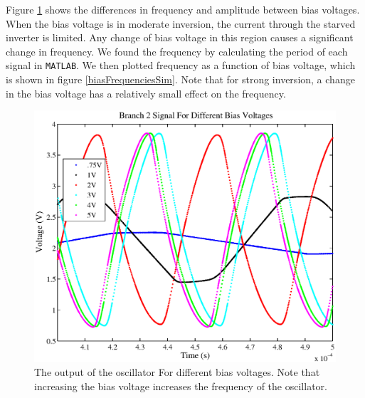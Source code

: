 \documentclass{article}
\begin{document}
Figure \ref{branch2DiffBiasSim} shows the differences in frequency and amplitude between bias voltages. When the bias voltage is in moderate inversion, the current through the starved inverter is limited. Any change of bias voltage in this region causes a significant change in frequency. We found the frequency by calculating the period of each signal in \texttt{MATLAB}. We then plotted frequency as a function of bias voltage, which is shown in figure \ref{biasFrequenciesSim}. Note that for strong inversion, a change in the bias voltage has a relatively small effect on the frequency. 

\begin{figure}[H]
\centering
\includegraphics[scale=.7]{branch2DiffBiasSim.eps}
\caption{The output of the oscillator For different bias voltages. Note that increasing the bias voltage increases the frequency of the oscillator.}
\label{branch2DiffBiasSim}
\end{figure}
\end{document}
